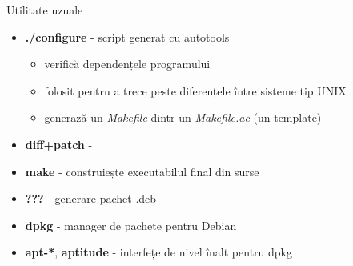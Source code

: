 \documentclass{beamer}
\begin{document}
\begin{frame}{Utilitate uzuale}
  \begin{itemize}[<+->]
  \item \textbf{./configure} - script generat cu autotools
    \begin{itemize}
    \item verifică dependențele programului
    \item folosit pentru a trece peste diferențele între sisteme tip UNIX
    \item generază un \textit{Makefile} dintr-un \textit{Makefile.ac} (un template)
    \end{itemize}
  \item \textbf{diff+patch} - 
  \item \textbf{make} - construiește executabilul final din surse
  \item \textbf{???} - generare pachet .deb
  \item \textbf{dpkg} - manager de pachete pentru Debian
  \item \textbf{apt-*}, \textbf{aptitude} - interfețe de nivel înalt pentru dpkg
  \end{itemize}
\end{frame}
\end{document}
